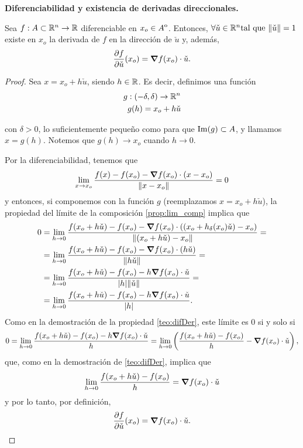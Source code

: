 \begin{theorem}\textbf{Diferenciabilidad y existencia de derivadas direccionales.}\label{teo:difDir}
\mbox{}

Sea $f: A \subset \mathbb{R}^n \to \mathbb{R}$ diferenciable en $x_o \in {\kern0ptA}^{\mathrm{o}}$. Entonces, $\forall \check{u} \in \mathbb{R}^n \text{tal que } \norm{\check{u}} = 1$ existe en $x_o$ la derivada de $f$ en la direcci\'on de $\check{u}$ y, adem\'as,
\[
 \frac{\partial f}{\partial \check{u}} (x_o) = \grad f (x_o) \cdot \check{u}.
\]

 \begin{proof}
 \mbox{}
 
 Sea $x = x_o + h \check{u}$, siendo $h \in \mathbb{R}$. Es decir, definimos una funci\'on 
 \begin{align*}
      g & :(-\delta,\delta) \to \mathbb{R}^n \\
        & g(h) = x_o + h \check{u}
 \end{align*}

con $\delta > 0$, lo suficientemente peque\~{n}o como para que $\operatorname{Im}(g) \subset A$, y llamamos $x = g(h)$. Notemos que $g(h) \to x_o$ cuando $h \to 0$. 

Por la diferenciabilidad, tenemos que 
\[
 \lim_{x \to x_o} \frac{f(x) - f(x_o) - \grad f (x_o) \cdot (x - x_o)}
                                 {\norm{x - x_o}} = 0
\]
y entonces, si componemos con la funci\'on $g$ (reemplazamos $x = x_o + h \check{u}$), la propiedad del l\'imite de la composici\'on \eqref{prop:lim_comp} implica que
\begin{align*}
  0 & = \lim_{h \to 0} \frac{f(x_o + h \check{u}) - f(x_o) - \grad f (x_o) \cdot ((x_o + h _{\delta}(x_o)\check{u}) - x_o) }
                    {\norm{(x_o + h \check{u}) - x_o}} = \\
    & = \lim_{h \to 0} \frac{f(x_o + h \check{u}) - f(x_o) - \grad f (x_o) \cdot (h \check{u}) }
                    {\norm{h \check{u}}} = \\
    & = \lim_{h \to 0} \frac{f(x_o + h \check{u}) - f(x_o) - h \grad f (x_o) \cdot \check{u} }
                    {\abs{h} \norm{\check{u}}} = \\
    & = \lim_{h \to 0} \frac{f(x_o + h \check{u}) - f(x_o) - h \grad f (x_o) \cdot \check{u} }
                    {\abs{h}}.  
\end{align*}                                
Como en la demostraci\'on de la propiedad \eqref{teo:difDer}, este l\'imite es $0$ si y solo si
\[
 0 = \lim_{h \to 0} \frac{f(x_o + h \check{u}) - f(x_o) - h \grad f (x_o) \cdot \check{u}}{h} = 
     \lim_{h \to 0} \left( \frac{f(x_o + h \check{u}) - f(x_o)}{h} - \grad f (x_o) \cdot \check{u} \right),
\]
que, como en la demostraci\'on de \eqref{teo:difDer}, implica que 
\[
 \lim_{h \to 0} \frac{f(x_o + h \check{u}) - f(x_o)}{h} = \grad f (x_o) \cdot \check{u}
\]
y por lo tanto, por definici\'on,
\[
 \frac{\partial f}{\partial \check{u}} (x_o) = \grad f (x_o) \cdot \check{u}.
\]
 \end{proof}
\end{theorem}
